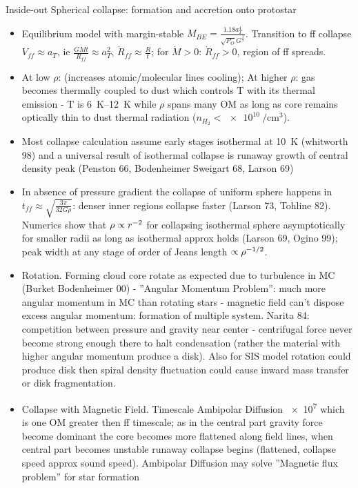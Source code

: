 \begin{frame}{Inside-out Spherical collapse: formation and accretion onto protostar} 
    \begin{itemize}
        \item Equilibrium model with margin-stable $M_{BE}=\frac{1.18a_T^4}{\sqrt{P_O}G^{\frac{3}{2}}}$. Transition to ff collapse $V_{ff}\approx a_T$, ie $\frac{G\dot{M}t}{R_{ff}}\approx a_T^2$, $\dot{R}_{ff}\approx \frac{R}{t}$; for $\dot{M}>0$: $\dot{R}_{ff}>0$, region of ff spreads.
        \item At low $\rho$: \xaumenta{\rho}  (increases atomic/molecular lines cooling); At higher $\rho$: gas becomes thermally coupled to dust which controls T with its thermal emission - T is \SIrange{6}{12}{\kelvin} while $\rho$ spans many OM as long as core remains optically thin to dust thermal radiation ($n_{H_2}<\SI{e10}{\per\cubic\cm}$).
        \item Most collapse calculation assume early stages isothermal at \SI{10}{\kelvin} (whitworth 98) and a universal result of isothermal collapse is runaway growth of central density peak (Penston 66, Bodenheimer Sweigart 68, Larson 69)
        \item In absence of pressure gradient the collapse of uniform sphere happens in $t_{ff}\approx\sqrt{\frac{3\pi}{32G\rho}}$: denser inner regions collapse faster (Larson 73, Tohline 82). Numerics show that $\rho\propto r^{-2}$ for collapsing isothermal sphere asymptotically for smaller radii as long as isothermal approx holds (Larson 69, Ogino 99); peak width at any stage of order of Jeans length $\propto\rho^{-1/2}$.
        \item Rotation. Forming cloud core rotate as expected due to turbulence in MC (Burket Bodenheimer 00) - ''Angular Momentum Problem'': much more angular momentum in MC than rotating stars - magnetic field can't dispose excess angular momentum: formation of multiple system. Narita 84: competition between pressure and gravity near center - centrifugal force never become strong enough there to halt condensation (rather the material with higher angular momentum produce a disk). Also for SIS model rotation could produce disk then spiral density fluctuation could cause inward mass transfer or disk fragmentation.
        \item Collapse with Magnetic Field. Timescale Ambipolar Diffusion \SI{e7}{\year} which is one OM greater then ff timescale; as in the central part gravity force become dominant the core becomes more flattened along field lines, when central part becomes unstable runaway collapse begins (flattened, collapse speed approx sound speed). Ambipolar Diffusion may solve ''Magnetic flux problem'' for star formation

    \end{itemize}
\end{frame}

